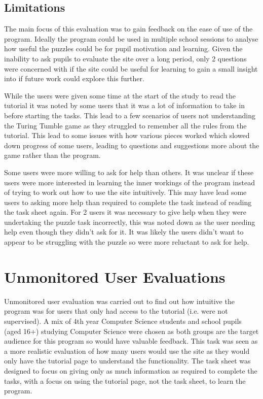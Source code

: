 \documentclass{l4proj}
\begin{document}
\subsection{Limitations}
The main focus of this evaluation was to gain feedback on the ease of use of the program. Ideally the program could be used in multiple school sessions to analyse how useful the puzzles could be for pupil motivation and learning. Given the inability to ask pupils to evaluate the site over a long period, only 2 questions were concerned with if the site could be useful for learning to gain a small insight into if future work could explore this further. 

While the users were given some time at the start of the study to read the tutorial it was noted by some users that it was a lot of information to take in before starting the tasks. This lead to a few scenarios of users not understanding the Turing Tumble game as they struggled to remember all the rules from the tutorial. This lead to some issues with how various pieces worked which slowed down progress of some users, leading to questions and suggestions more about the game rather than the program. 

Some users were more willing to ask for help than others. It was unclear if these users were more interested in learning the inner workings of the program instead of trying to work out how to use the site intuitively. This may have lead some users to asking more help than required to complete the task instead of reading the task sheet again. For 2 users it was necessary to give help when they were undertaking the puzzle task incorrectly, this was noted down as the user needing help even though they didn't ask for it. It was likely the users didn't want to appear to be struggling with the puzzle so were more reluctant to ask for help.  


\section{Unmonitored User Evaluations}
Unmonitored user evaluation was carried out to find out how intuitive the program was for users that only had access to the tutorial (i.e. were not supervised). A mix of 4th year Computer Science students and school pupils (aged 16+) studying Computer Science were chosen as both groups are the target audience for this program so would have valuable feedback. This task was seen as a more realistic evaluation of how many users would use the site as they would only have the tutorial page to understand the functionality. The task sheet was designed to focus on giving only as much information as required to complete the tasks, with a focus on using the tutorial page, not the task sheet, to learn the program. 
\end{document}
